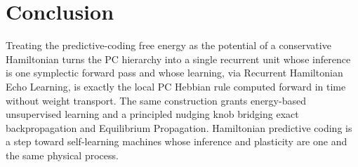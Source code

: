 \documentclass[10pt]{article}
\theoremstyle{remark}
\begin{document}
\section{Conclusion}
\label{sec:conclusion}
Treating the predictive-coding free energy as the potential of a conservative
Hamiltonian turns the PC hierarchy into a single recurrent unit whose
inference is one symplectic forward pass and whose learning, via Recurrent
Hamiltonian Echo Learning, is exactly the local PC Hebbian rule computed
forward in time without weight transport. The same construction grants
energy-based unsupervised learning and a principled nudging knob bridging
exact backpropagation and Equilibrium Propagation. Hamiltonian predictive
coding is a step toward self-learning machines whose inference and plasticity
are one and the same physical process.
\end{document}
